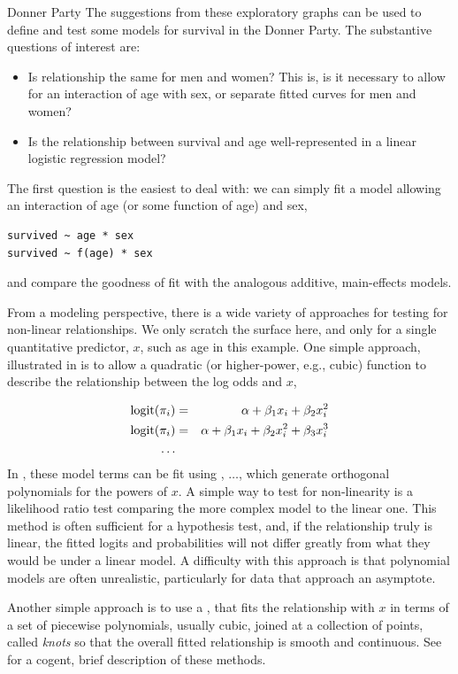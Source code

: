 \documentclass[11pt]{book}\usepackage[]{graphicx}\usepackage[]{color}
\begin{document}
\begin{Example}[donner1]{Donner Party}
The suggestions from these exploratory graphs can be used to define and test some models
for survival in the Donner Party.  The substantive questions of interest are:
\begin{itemize}
  \item Is relationship the same for men and women?  This is, is it necessary to allow for an interaction of age with sex, or separate fitted curves for men and women?
  \item Is the relationship between survival and age well-represented in a linear logistic regression model?
\end{itemize}

The first question is the easiest to deal with:  we can simply fit a model allowing an
interaction of age (or some function of age) and sex,
\begin{verbatim}
survived ~ age * sex
survived ~ f(age) * sex
\end{verbatim}
and compare the goodness of fit with the analogous additive, main-effects models.

From a modeling perspective, there is a wide variety of approaches for testing for non-linear
relationships. We only scratch the surface here, and only for a single quantitative predictor,
$x$, such as age in this example.
One simple approach, illustrated in  is to allow a quadratic
(or higher-power, e.g., cubic) function to describe the relationship between the log odds
and $x$,

\begin{eqnarray*}
 \logit (\pi_i) & = & \alpha + \beta_1 x_i + \beta_2 x_i^2 \\
 \logit (\pi_i) & = & \alpha + \beta_1 x_i + \beta_2 x_i^2  + \beta_3 x_i^3 \\
 \dots
\end{eqnarray*}
In \R, these model terms can be fit using ,  $\dots$,
which generate orthogonal polynomials for the powers of $x$.  
A simple way to test for non-linearity is a likelihood ratio test comparing the
more complex model to the linear one.  This method is often sufficient for a hypothesis
test, and, if the relationship truly is linear, the fitted logits and probabilities
will not differ greatly from what they would be under a linear model.
A difficulty with this approach is that polynomial models are often unrealistic,
particularly for data that approach an asymptote.

Another  simple approach is to use a ,
that fits the relationship with $x$ in terms of a set of piecewise
polynomials, usually cubic, joined at a collection of points, called \emph{knots}
so that the overall fitted relationship is smooth and continuous.
See \citet[\S 17.2]{Fox:2008} for a cogent, brief description of these methods.


\end{Example}
\end{document}
